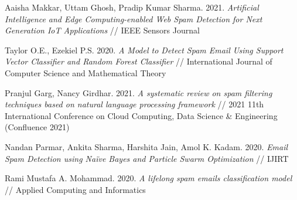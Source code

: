 \documentclass[12pt]{jpconf}
\begin{document}
\begin{thebibliography}{99}
Aaisha Makkar, Uttam Ghosh, Pradip Kumar Sharma.
2021. \emph{Artificial Intelligence and Edge Computing-enabled
	Web Spam Detection for Next Generation IoT
	Applications} // IEEE Sensors Journal

Taylor O.E., Ezekiel P.S.
2020. \emph{A Model to Detect Spam Email Using Support Vector Classifier and Random Forest Classifier} //
International Journal of Computer Science and Mathematical Theory

Pranjul Garg, Nancy Girdhar.
2021. \emph{A systematic review on spam filtering techniques based on
natural language processing framework} // 2021 11th International Conference on Cloud Computing, Data Science \& Engineering (Confluence 2021)

Nandan Parmar, Ankita Sharma, Harshita Jain, Amol K. Kadam.
2020. \emph{Email Spam Detection using Naïve Bayes and Particle Swarm Optimization} // IJIRT

Rami Mustafa A. Mohammad.
2020. \emph{A lifelong spam emails 	classification model} //
Applied Computing and Informatics
\end{thebibliography}
\end{document}
